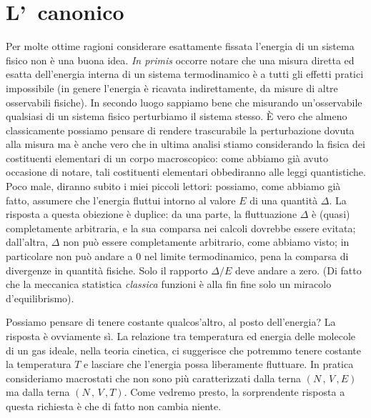 \chapter{L'\ensemble\ canonico}
\label{cap:canonico}

Per molte ottime ragioni considerare esattamente fissata l'energia di un sistema fisico non è una buona idea. {\em In primis} occorre notare che una misura diretta ed esatta dell'energia interna di un sistema termodinamico è a tutti gli effetti pratici impossibile (in genere l'energia è ricavata indirettamente, da misure di altre osservabili fisiche). In secondo luogo sappiamo bene che misurando un'osservabile qualsiasi di un sistema fisico perturbiamo il sistema stesso. \`E vero che almeno classicamente possiamo pensare di rendere trascurabile la perturbazione dovuta alla misura ma è anche vero che in ultima analisi stiamo considerando la fisica dei costituenti elementari di un corpo macroscopico: come abbiamo già avuto occasione di notare, tali costituenti elementari obbediranno alle leggi quantistiche. Poco male, diranno subito i miei piccoli lettori: possiamo, come abbiamo già fatto, assumere che l'energia fluttui intorno al valore $E$ di una quantità $\Delta$. La risposta a questa obiezione è duplice: da una parte, la fluttuazione $\Delta$ è (quasi) completamente arbitraria, e la sua comparsa nei calcoli dovrebbe essere evitata; dall'altra, $\Delta$ non può essere completamente arbitrario, come abbiamo visto; in particolare non può andare a $0$ nel limite termodinamico, pena la comparsa di divergenze in quantità fisiche. Solo il rapporto $\Delta/E$ deve andare a zero. (Di fatto che la meccanica statistica {\em classica} funzioni è alla fin fine solo un miracolo d'equilibrismo).

Possiamo pensare di tenere costante qualcos'altro, al posto dell'energia? La risposta è ovviamente sì. La relazione tra temperatura ed energia delle molecole di un gas ideale, nella teoria cinetica, ci suggerisce che potremmo tenere costante la temperatura $T$ e lasciare che l'energia possa liberamente fluttuare. In pratica consideriamo macrostati che non sono più caratterizzati dalla terna $(N\,,\,V\,,E)$ ma dalla terna $(N\,,\,V\,,T)$. Come vedremo  presto, la sorprendente risposta a questa richiesta è che di fatto non cambia niente.


